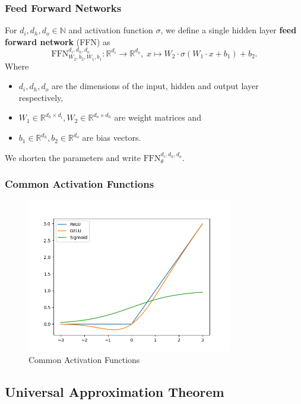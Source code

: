 \documentclass[serif]{beamer}
\def\R{{\mathbb R}}
\def\N{{\mathbb N}}
\begin{document}
\begin{frame}
    \frametitle{Feed Forward Networks}
    For $d_i, d_h, d_o \in \N$
    and activation function $\sigma$,
    we define a single hidden layer \textbf{feed forward network} (FFN) as
    \[
        \text{FFN}_{W_2, b_2, W_1, b_1}^{d_i, d_h, d_o} : \R^{d_i} \to \R^{d_o}, \;
        x \mapsto W_2 \cdot \sigma (W_1 \cdot x + b_1) + b_2.
    \]
    Where
    \begin{itemize}
        \item $d_i, d_h, d_o$ are the dimensions of the input, hidden and output layer respectively,
        \item $W_1 \in \R^{d_h \times d_i}, W_2 \in \R^{d_o \times d_h}$ are weight matrices and
        \item $b_1 \in \R^{d_h}, b_2 \in \R^{d_o}$ are bias vectors.
    \end{itemize}
    We shorten the parameters and write $\text{FFN}_\theta^{d_i, d_h, d_o}$.
\end{frame}

\begin{frame}
    \frametitle{Common Activation Functions}
    \begin{figure}
        \includegraphics[width=0.8\textwidth]{./images/activation_functions.png}
        \caption{Common Activation Functions}
    \end{figure}
\end{frame}

\subsection{Universal Approximation Theorem}
\end{document}
